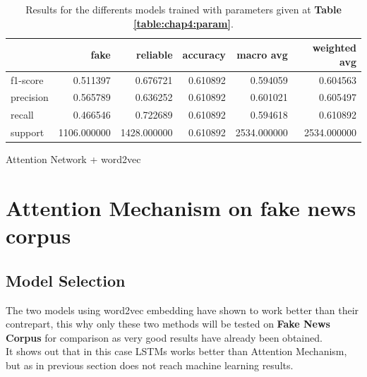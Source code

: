 \begin{table}
\begin{subtable}{\textwidth}
\begin{tabular}{lrrrrr}
\toprule
{} &         fake &     reliable &  accuracy &    macro avg &  weighted avg \\
\midrule
f1-score  &     0.511397 &     0.676721 &  0.610892 &     0.594059 &      0.604563 \\
precision &     0.565789 &     0.636252 &  0.610892 &     0.601021 &      0.605497 \\
recall    &     0.466546 &     0.722689 &  0.610892 &     0.594618 &      0.610892 \\
support   &  1106.000000 &  1428.000000 &  0.610892 &  2534.000000 &   2534.000000 \\
\bottomrule
\end{tabular}
\caption{Attention Network + word2vec}
\end{subtable}
\caption{Results for the differents models trained with parameters given at \textbf{Table \ref{table:chap4:param}}.}
\label{table:chap4:results}
\end{table}

\section{Attention Mechanism on fake news corpus}
\subsection{Model Selection}
The two models using word2vec embedding have shown to work better than their contrepart, this why only these two methods will be tested on \textbf{Fake News Corpus} for comparison as very good results have already been obtained. \\

It shows out that in this case LSTMs works better than Attention Mechanism, but as in previous section does not reach machine learning results. \\

